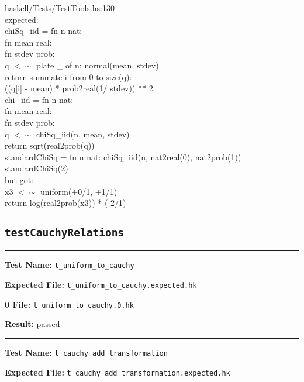 \documentclass[11pt]{article}
\begin{document}
\bigskip
\noindent
haskell/Tests/TestTools.hs:130\\expected:\\chiSq\_iid = fn n nat:\\            fn mean real:\\            fn stdev prob:\\            q $<\sim$ plate \_ of n: normal(mean, stdev)\\            return summate i from 0 to size(q):\\                   ((q[i] - mean) * prob2real(1/ stdev)) ** 2\\chi\_iid = fn n nat:\\          fn mean real:\\          fn stdev prob:\\          q $<\sim$ chiSq\_iid(n, mean, stdev)\\          return sqrt(real2prob(q))\\standardChiSq = fn n nat: chiSq\_iid(n, nat2real(0), nat2prob(1))\\standardChiSq(2)\\but got:\\x3 $<\sim$ uniform(+0/1, +1/1)\\return log(real2prob(x3)) * (-2/1)\\

\subsection{{\tt testCauchyRelations}}

\hrule

\bigskip
\textbf{Test Name:} {\tt t\_uniform\_to\_cauchy}

\textbf{Expected File:} {\tt t\_uniform\_to\_cauchy.expected.hk}

\bigskip


\bigskip
\textbf{0 File:} {\tt t\_uniform\_to\_cauchy.0.hk}

\bigskip


\bigskip
\textbf{Result:} passed

\bigskip
\hrule

\bigskip
\textbf{Test Name:} {\tt t\_cauchy\_add\_transformation}

\textbf{Expected File:} {\tt t\_cauchy\_add\_transformation.expected.hk}
\end{document}
